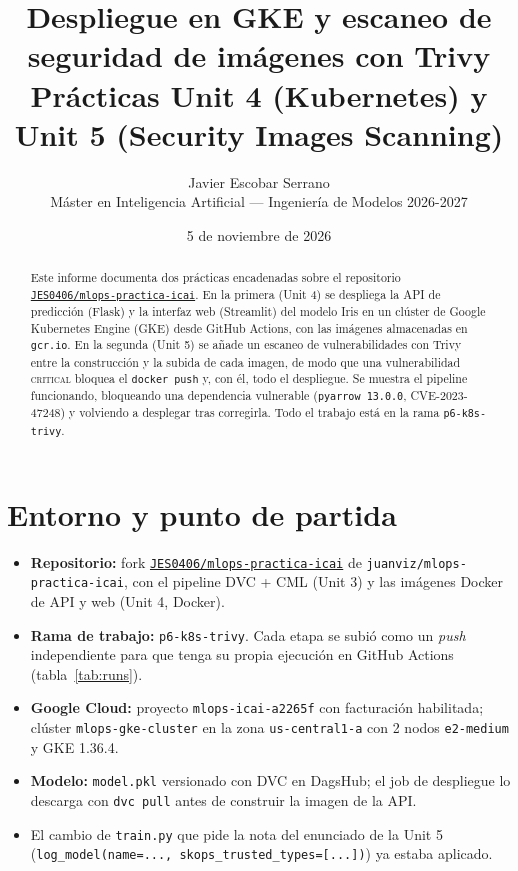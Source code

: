 \documentclass[11pt,a4paper]{article}
\title{\textbf{Despliegue en GKE y escaneo de seguridad de imágenes con Trivy}\\[0.4em]
\large Prácticas Unit 4 (Kubernetes) y Unit 5 (Security Images Scanning)}
\author{Javier Escobar Serrano\\
\small Máster en Inteligencia Artificial --- Ingeniería de Modelos 2026-2027}
\date{5 de noviembre de 2026}
\newcommand{\code}[1]{\texttt{#1}}
\newcommand{\repo}{\href{https://github.com/JES0406/mlops-practica-icai}{\code{JES0406/mlops-practica-icai}}}
\begin{document}
\maketitle
\thispagestyle{empty}

\begin{abstract}
Este informe documenta dos prácticas encadenadas sobre el repositorio \repo{}.
En la primera (Unit 4) se despliega la API de predicción (Flask) y la interfaz
web (Streamlit) del modelo Iris en un clúster de Google Kubernetes Engine (GKE)
desde GitHub Actions, con las imágenes almacenadas en \code{gcr.io}. En la
segunda (Unit 5) se añade un escaneo de vulnerabilidades con Trivy entre la
construcción y la subida de cada imagen, de modo que una vulnerabilidad
\textsc{critical} bloquea el \code{docker push} y, con él, todo el despliegue.
Se muestra el pipeline funcionando, bloqueando una dependencia vulnerable
(\code{pyarrow 13.0.0}, CVE-2023-47248) y volviendo a desplegar tras corregirla.
Todo el trabajo está en la rama \code{p6-k8s-trivy}.
\end{abstract}

\tableofcontents
\newpage

\section{Entorno y punto de partida}

\begin{itemize}[nosep]
  \item \textbf{Repositorio:} fork \repo{} de \code{juanviz/mlops-practica-icai},
    con el pipeline DVC + CML (Unit 3) y las imágenes Docker de API y web (Unit 4, Docker).
  \item \textbf{Rama de trabajo:} \code{p6-k8s-trivy}. Cada etapa se subió como un
    \emph{push} independiente para que tenga su propia ejecución en GitHub Actions
    (tabla~\ref{tab:runs}).
  \item \textbf{Google Cloud:} proyecto \code{mlops-icai-a2265f} con facturación
    habilitada; clúster \code{mlops-gke-cluster} en la zona \code{us-central1-a}
    con 2 nodos \code{e2-medium} y GKE 1.36.4.
  \item \textbf{Modelo:} \code{model.pkl} versionado con DVC en DagsHub; el job de
    despliegue lo descarga con \code{dvc pull} antes de construir la imagen de la API.
  \item El cambio de \code{train.py} que pide la nota del enunciado de la Unit 5
    (\code{log\_model(name=..., skops\_trusted\_types=[...])}) ya estaba aplicado.
\end{itemize}
\end{document}
